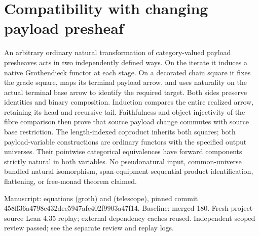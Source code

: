 \documentclass{article}
\begin{document}
\section*{Compatibility with changing payload presheaf}
An arbitrary ordinary natural transformation of category-valued payload presheaves acts in two independently defined ways. On the iterate it induces a native Grothendieck functor at each stage. On a decorated chain square it fixes the grade square, maps its terminal payload arrow, and uses naturality on the actual terminal base arrow to identify the required target. Both sides preserve identities and binary composition. Induction compares the entire realized arrow, retaining its head and recursive tail. Faithfulness and object injectivity of the fibre comparison then prove that source payload change commutes with source base restriction. The length-indexed coproduct inherits both squares; both payload-variable constructions are ordinary functors with the specified output universes. Their pointwise categorical equivalences have forward components strictly natural in both variables. No pseudonatural input, common-universe bundled natural isomorphism, span-equipment sequential product identification, flattening, or free-monad theorem claimed.
\par Manuscript: equations (groth) and (telescope), pinned commit 458ff36a4798e432dee5947afc402f9903a47f14. Baseline: merged 180. Fresh project-source Lean 4.35 replay; external dependency caches reused. Independent scoped review passed; see the separate review and replay logs.
\end{document}
